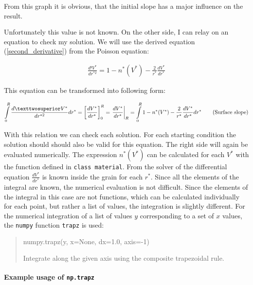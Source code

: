 \documentclass[11pt]{article}
\begin{document}
    From this graph it is obvious, that the initial slope has a major
influence on the result.

Unfortunately this value is not known. On the other side, I can relay on
an equation to check my solution. We will use the derived equation
(\ref{second_derivative}) from the Poisson equation:

\begin{align}
\frac{d²V^{*}}{dr^{*2}}=1-n^{*}(V^{*})-\frac{2}{r^{*}}\frac{dV^{*}}{dr^{*}}
\end{align}

This equation can be transformed into following form:

\begin{align}
\intop_{0}^{R}\frac{d²V^{*}}{dr^{*2}}dr^*=\left[\frac{dV^{*}}{dr^{*}}\right]_{0}^{R}=\left.\frac{dV^*}{dr^{*}}\right|_{R}=\intop_{0}^{R}1-n^{*}(V^{*})-\frac{2}{r^{*}}\frac{dV^{*}}{dr^{*}}dr^*\label{second_derivative}\tag{Surface slope}
\end{align}

With this relation we can check each solution. For each starting
condition the solution should should also be valid for this equation.
The right side will again be evaluated numerically. The expression
\(n^{*}(V^{*})\) can be calculated for each \(V^{*}\) with the function
defined in \texttt{class\ material}. From the solver of the differential
equation \(\frac{dV^*}{dr^{*}}\) is known inside the grain for each
\(r^*\). Since all the elements of the integral are known, the numerical
evaluation is not difficult. Since the elements of the integral in this
case are not functions, which can be calculated individually for each
point, but rather a list of values, the integration is slightly
different. For the numerical integration of a list of values \(y\)
corresponding to a set of \(x\) values, the \texttt{numpy} function
\texttt{trapz} is used:

\begin{quote}
numpy.trapz(y, x=None, dx=1.0, axis=-1)

Integrate along the given axis using the composite trapezoidal rule.
\end{quote}

    \hypertarget{example-usage-of-np.trapz}{%
\paragraph{\texorpdfstring{Example usage of
\texttt{np.trapz}}{Example usage of np.trapz}}\label{example-usage-of-np.trapz}}
\end{document}
